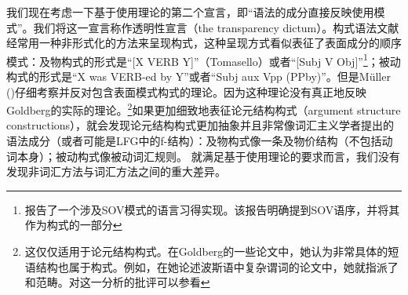     我们现在考虑一下基于使用理论的第二个宣言，即“语法的成分直接反映使用模式”。我们将这一宣言称作透明性宣言（the transparency dictum）。构式语法文献经常用一种非形式化的方法来呈现构式，这种呈现方式看似表征了表面成分的顺序模式：及物构式的形式是“[X VERB Y]”（Tomasello）或者“[Subj V Obj]”\citep{Goldberg95a,Goldberg2006a}\footnote{
  \citet[]{GCS2004a}报告了一个涉及SOV模式的语言习得实现。该报告明确提到SOV语序，并将其作为构式的一部分
}；被动构式的形式是“X was VERB-ed by Y”\citep[]{Tomasello2003a}或者“Subj aux Vpp (PPby)”\citep[]{Goldberg2006a}。但是Müller (\citeyear[\S~2]{Mueller2006d})仔细考察并反对包含表面模式构式的理论。因为这种理论没有真正地反映Goldberg的实际的理论。\footnote{
这仅仅适用于论元结构构式。在Goldberg的一些论文中，她认为非常具体的短语结构也属于构式。例如，在她论述波斯语中复杂谓词的论文\citep{Goldberg2003a}中，她就指派了\vnullc 和\vbarc 范畴。对这一分析的批评可以参看
}如果更加细致地表征论元结构构式（argument structure constructions），就会发现论元结构构式更加抽象并且非常像词汇主义学者提出的语法成分（或者可能是LFG中的f-结构）：及物构式像一条及物价结构（不包括动词本身）；被动构式像被动词汇规则。
    就满足基于使用理论的要求而言，我们没有发现非词汇方法与词汇方法之间的重大差异。

